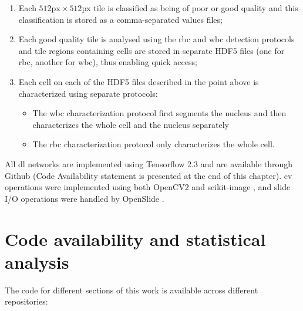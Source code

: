 \begin{enumerate}
    \item Each $512\mathrm{px} \times 512\mathrm{px}$ tile is classified as being of poor or good quality and this classification is stored as a comma-separated values files;
    \item Each good quality tile is analysed using the \ac{rbc} and \ac{wbc} detection protocols and tile regions containing cells are stored in separate HDF5 files (one for \ac{rbc}, another for \ac{wbc}), thus enabling quick access;
    \item Each cell on each of the HDF5 files described in the point above is characterized using separate protocols:
    \begin{itemize}
        \item The \ac{wbc} characterization protocol first segments the nucleus and then characterizes the whole cell and the nucleus separately
        \item The \ac{rbc} characterization protocol only characterizes the whole cell.
    \end{itemize}
\end{enumerate}

\begin{figure}[!ht]
    \label{fig:pipeline-schematic}
\end{figure}

All \ac{dl} networks are implemented using Tensorflow 2.3 \cite{tensorflow2015-whitepaper} and are available through Github (Code Availability statement is presented at the end of this chapter). \Ac{cv} operations were implemented using both OpenCV2 \cite{opencv_library} and scikit-image \cite{van2014scikit}, and slide I/O operations were handled by OpenSlide \cite{Goode2013-zs}.

\section{Code availability and statistical analysis}

The code for different sections of this work is available across different repositories:

